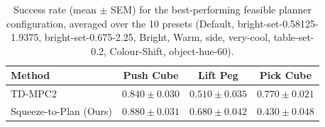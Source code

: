 \begin{table}[t]
\centering
\begin{tabular}{lccc}
\toprule
Method & Push Cube & Lift Peg & Pick Cube \\
\midrule
TD-MPC2 & $0.840 \pm 0.030$ & $0.510 \pm 0.035$ & $0.770 \pm 0.021$ \\
Squeeze-to-Plan (Ours) & $0.880 \pm 0.031$ & $0.680 \pm 0.042$ & $0.430 \pm 0.048$ \\
\bottomrule
\end{tabular}
\caption{Success rate (mean $\pm$ SEM) for the best-performing feasible planner configuration, averaged over the 10 presets (Default, bright-set-0.58125-1.9375, bright-set-0.675-2.25, Bright, Warm, side, very-cool, table-set-0.2, Colour-Shift, object-hue-60).}
\label{tab:latency_vs_success_rate_mean_over_presets}
\end{table}
